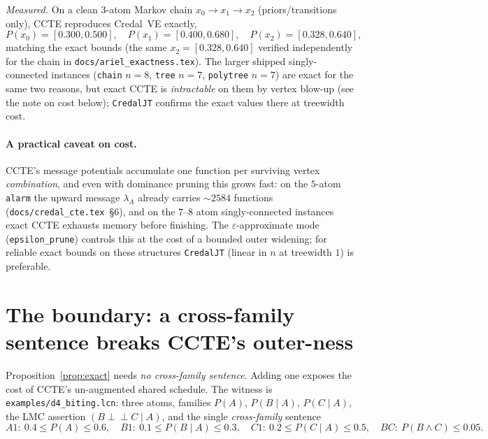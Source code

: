 \documentclass[11pt]{article}
\newcommand{\indep}{\perp\!\!\!\perp}
\begin{document}
\smallskip\noindent\emph{Measured.} On a clean $3$-atom Markov chain
$x_0\!\to\!x_1\!\to\!x_2$ (priors/transitions only), CCTE reproduces Credal~VE exactly,
\[
  P(x_0)=[0.300,0.500],\quad P(x_1)=[0.400,0.680],\quad P(x_2)=[0.328,0.640],
\]
matching the exact bounds (the same $x_2=[0.328,0.640]$ verified independently for the chain in
\texttt{docs/ariel\_exactness.tex}). The larger shipped singly-connected instances
(\texttt{chain} $n{=}8$, \texttt{tree} $n{=}7$, \texttt{polytree} $n{=}7$) are exact for the same
two reasons, but exact CCTE is \emph{intractable} on them by vertex blow-up (see the note on cost
below); \texttt{CredalJT} confirms the exact values there at treewidth cost.

\paragraph{A practical caveat on cost.} CCTE's message potentials accumulate one function per
surviving vertex \emph{combination}, and even with dominance pruning this grows fast: on the
$5$-atom \texttt{alarm} the upward message $\lambda_A$ already carries $\sim\!2584$ functions
(\texttt{docs/credal\_cte.tex}~\S6), and on the $7$--$8$ atom singly-connected instances exact
CCTE exhausts memory before finishing. The $\varepsilon$-approximate mode
(\texttt{epsilon\_prune}) controls this at the cost of a bounded outer widening; for reliable
exact bounds on these structures \texttt{CredalJT} (linear in $n$ at treewidth $1$) is
preferable.

\section{The boundary: a cross-family sentence breaks CCTE's outer-ness}\label{sec:boundary}

Proposition~\ref{prop:exact} needs \emph{no cross-family sentence}. Adding one exposes the cost
of CCTE's un-augmented shared schedule. The witness is \texttt{examples/d4\_biting.lcn}: three
atoms, families $P(A)$, $P(B\mid A)$, $P(C\mid A)$, the LMC assertion $(B\indep C\mid A)$, and
the single \emph{cross-family} sentence
\[
  A1{:}\ 0.4\le P(A)\le 0.6,\quad B1{:}\ 0.1\le P(B\mid A)\le 0.3,\quad
  C1{:}\ 0.2\le P(C\mid A)\le 0.5,\quad \boxed{BC{:}\ P(B\land C)\le 0.05}.
\]
\end{document}
